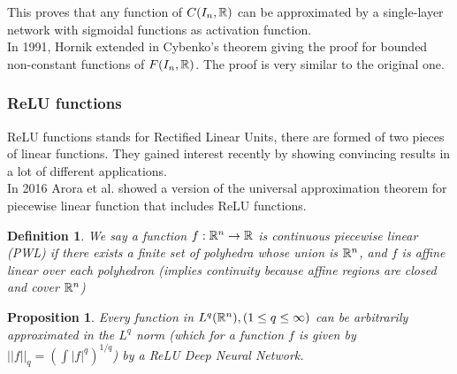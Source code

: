 \documentclass[12pt, a4paper]{article}
\newtheorem{proposition}{Proposition}
\newtheorem{definition}{Definition}
\begin{document}
  This proves that any function of $C(I_n, \mathbb{R})$ can be approximated by a single-layer network with sigmoidal functions as activation function.\\

  In 1991, Hornik extended in \cite{hornik_approximation_1991} Cybenko's theorem giving the proof for bounded non-constant functions of $F(I_n,\mathbb{R})$. The proof is very similar to the original one.\\

\subsubsection{ReLU functions}

ReLU functions stands for Rectified Linear Units, there are formed of two pieces of linear functions. They gained interest recently by showing convincing results in a lot of different applications.\\ 

In 2016 Arora et al. \cite{arora_understanding_2018} showed a version of the universal approximation theorem for piecewise linear function that includes ReLU functions.\\

\begin{definition}
  We say a function $f: \mathbb{R}^n \to \mathbb{R}$ is continuous piecewise linear (PWL) if there exists a finite set of polyhedra whose union is $\mathbb{R}^n$, and $f$ is affine linear over each polyhedron (implies continuity because affine regions are closed and cover $\mathbb{R}^n$)
\end{definition}

\begin{proposition}
  Every function in $L^q(\mathbb{R}^n), (1 \le q \le \infty)$ can be arbitrarily approximated in the $L^q$ norm (which for a function $f$ is given by $||f||_q = (\int |f|^q)^{1/q}$) by a ReLU Deep Neural Network.
\end{proposition}
\end{document}
